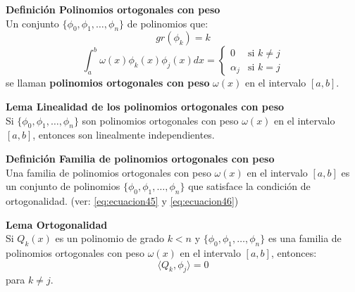 \documentclass{article}
\newenvironment{definition}[2][Definición]
    { \begin{mdframed}[backgroundcolor=blue!10] \textbf{#1 #2} \\}
    {  \end{mdframed}}
\newenvironment{lema}[2][Lema]
    { \begin{mdframed}[backgroundcolor=blue!10] \textbf{#1 #2} \\}
    {  \end{mdframed}}
\begin{document}
\begin{definition}{Polinomios ortogonales con peso}
    Un conjunto $\{ \phi_0, \phi_1, \dots, \phi_n \}$ de polinomios que:
    \begin{equation}
        gr(\phi_k) = k
        \label{eq:ecuacion45}
    \end{equation}
    \begin{equation}
        \int_{a}^{b} \omega(x) \phi_k(x) \phi_j(x) dx = 
        \begin{cases}
            0 & \text{si } k \neq j \\
            \alpha_j & \text{si } k = j
        \end{cases}
        \label{eq:ecuacion46}
    \end{equation}
    se llaman \textbf{polinomios ortogonales con peso} $\omega(x)$ en el intervalo $[a,b]$.
\end{definition}

\begin{lema}{Linealidad de los polinomios ortogonales con peso}
    Si $\{ \phi_0, \phi_1, \dots, \phi_n \}$ son polinomios ortogonales con peso $\omega(x)$ en el intervalo $[a,b]$, entonces son linealmente independientes.
\end{lema}

\begin{definition}{Familia de polinomios ortogonales con peso}
    Una familia de polinomios ortogonales con peso $\omega(x)$ en el intervalo $[a,b]$ es un conjunto de polinomios $\{ \phi_0, \phi_1, \dots, \phi_n \}$ que satisface la condición de ortogonalidad. (ver: \ref{eq:ecuacion45} y \ref{eq:ecuacion46})
\end{definition}

\begin{lema}{Ortogonalidad}
    Si $Q_k(x)$ es un polinomio de grado $k<n$ y $\{ \phi_0, \phi_1, \dots, \phi_n \}$ es una familia de polinomios ortogonales con peso $\omega(x)$ en el intervalo $[a,b]$, entonces:
    \begin{equation}
        \langle Q_k, \phi_j \rangle = 0
    \end{equation}
    para $k\neq j$.
\end{lema}
\end{document}
